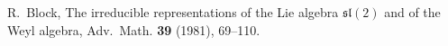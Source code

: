 \documentclass[11pt]{article}
\numberwithin{equation}{section}
\begin{document}
  
\begin{thebibliography}{}



  


 R.~Block, The irreducible representations of the Lie algebra $\mathfrak{sl}(2)$ and of the Weyl algebra, Adv.~Math. {\bf 39} (1981), 69--110.

  







  





\end{thebibliography}
\end{document}
